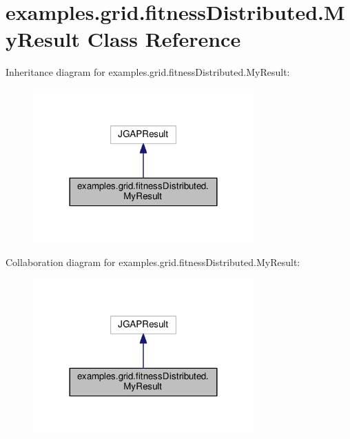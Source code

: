 \hypertarget{classexamples_1_1grid_1_1fitness_distributed_1_1_my_result}{\section{examples.\-grid.\-fitness\-Distributed.\-My\-Result Class Reference}
\label{classexamples_1_1grid_1_1fitness_distributed_1_1_my_result}
}


Inheritance diagram for examples.\-grid.\-fitness\-Distributed.\-My\-Result\-:
\nopagebreak
\begin{figure}[H]
\begin{center}
\leavevmode
\includegraphics[width=240pt]{classexamples_1_1grid_1_1fitness_distributed_1_1_my_result__inherit__graph}
\end{center}
\end{figure}


Collaboration diagram for examples.\-grid.\-fitness\-Distributed.\-My\-Result\-:
\nopagebreak
\begin{figure}[H]
\begin{center}
\leavevmode
\includegraphics[width=240pt]{classexamples_1_1grid_1_1fitness_distributed_1_1_my_result__coll__graph}
\end{center}
\end{figure}

